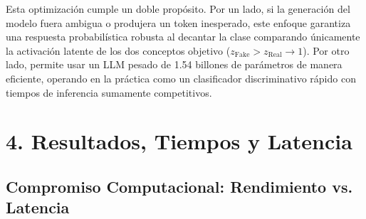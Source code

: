 \begin{itemize}
    Esta optimización cumple un doble propósito. Por un lado, si la generación del modelo fuera ambigua o produjera un token inesperado, este enfoque garantiza una respuesta probabilística robusta al decantar la clase comparando únicamente la activación latente de los dos conceptos objetivo ($z_{\text{Fake}} > z_{\text{Real}} \to 1$). Por otro lado, permite usar un LLM pesado de 1.54 billones de parámetros de manera eficiente, operando en la práctica como un clasificador discriminativo rápido con tiempos de inferencia sumamente competitivos.
\end{itemize}


\section*{4. Resultados, Tiempos y Latencia}

\begin{table}[H]
\centering
\caption{Métricas Globales de Rendimiento y Latencia ($N = 2.604$ Registros)}
\label{tab:metricas_globales}
\end{table}

\subsection{Compromiso Computacional: Rendimiento vs. Latencia}

